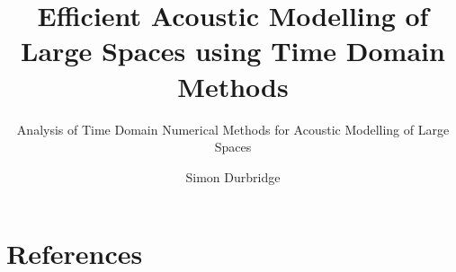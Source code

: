 \documentclass[]{svmono}
\begin{document}
\author{Simon Durbridge} %

\title{Efficient Acoustic Modelling of Large Spaces using Time Domain Methods} %

\subtitle{Analysis of Time Domain Numerical Methods for Acoustic Modelling of Large Spaces}
\maketitle

\frontmatter%

%
%
%
%

\tableofcontents
%

\mainmatter%



%


\backmatter%
\chapter{References}

%
%

\end{document}
